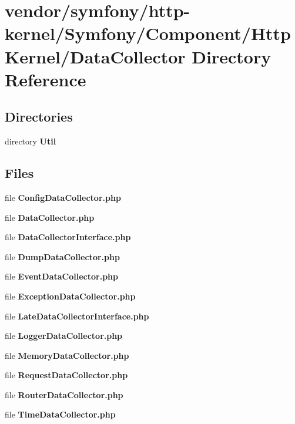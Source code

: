 \section{vendor/symfony/http-\/kernel/\+Symfony/\+Component/\+Http\+Kernel/\+Data\+Collector Directory Reference}
\label{dir_25ed652516fbd41caf1998673c4ba46e}
\subsection*{Directories}
\begin{DoxyCompactItemize}
\item 
directory {\bf Util}
\end{DoxyCompactItemize}
\subsection*{Files}
\begin{DoxyCompactItemize}
\item 
file {\bf Config\+Data\+Collector.\+php}
\item 
file {\bf Data\+Collector.\+php}
\item 
file {\bf Data\+Collector\+Interface.\+php}
\item 
file {\bf Dump\+Data\+Collector.\+php}
\item 
file {\bf Event\+Data\+Collector.\+php}
\item 
file {\bf Exception\+Data\+Collector.\+php}
\item 
file {\bf Late\+Data\+Collector\+Interface.\+php}
\item 
file {\bf Logger\+Data\+Collector.\+php}
\item 
file {\bf Memory\+Data\+Collector.\+php}
\item 
file {\bf Request\+Data\+Collector.\+php}
\item 
file {\bf Router\+Data\+Collector.\+php}
\item 
file {\bf Time\+Data\+Collector.\+php}
\end{DoxyCompactItemize}
